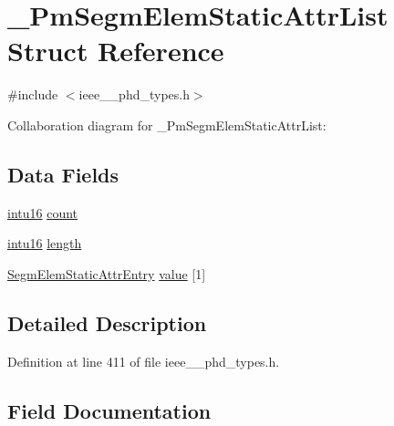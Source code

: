 \hypertarget{struct___pm_segm_elem_static_attr_list}{}\section{\+\_\+\+Pm\+Segm\+Elem\+Static\+Attr\+List Struct Reference}
\label{struct___pm_segm_elem_static_attr_list}


{\ttfamily \#include $<$ieee\+\_\+\_\+phd\+\_\+types.\+h$>$}



Collaboration diagram for \+\_\+\+Pm\+Segm\+Elem\+Static\+Attr\+List\+:
\subsection*{Data Fields}
\begin{DoxyCompactItemize}
\item 
\hyperlink{ieee__11073__phd__types_8h_a3561595d2aa7416532e1c9910abd076d}{intu16} \hyperlink{struct___pm_segm_elem_static_attr_list_abf6db060ae8e224764b0f867fb135ecd}{count}
\item 
\hyperlink{ieee__11073__phd__types_8h_a3561595d2aa7416532e1c9910abd076d}{intu16} \hyperlink{struct___pm_segm_elem_static_attr_list_a3743679e4ff85e3e1b3fc2e59973fbb3}{length}
\item 
\hyperlink{ieee__11073__phd__types_8h_ab311ddf4262bbc52be261fa4b0c438ba}{Segm\+Elem\+Static\+Attr\+Entry} \hyperlink{struct___pm_segm_elem_static_attr_list_a4c70f7dda06f89fc5097a04d0fc0a178}{value} \mbox{[}1\mbox{]}
\end{DoxyCompactItemize}


\subsection{Detailed Description}


Definition at line 411 of file ieee\+\_\+\_\+phd\+\_\+types.\+h.



\subsection{Field Documentation}
\hypertarget{struct___pm_segm_elem_static_attr_list_abf6db060ae8e224764b0f867fb135ecd}{}
